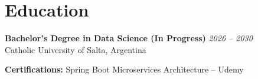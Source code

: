 \documentclass[11pt,a4paper]{article}
\newcommand{\entry}[3]{%
  \noindent\textbf{#1} \hfill \textit{#2} \\
  #3
}
\begin{document}
\section*{Education}
\entry{Bachelor's Degree in Data Science (In Progress)}{2026 -- 2030}{Catholic University of Salta, Argentina}

\vspace{4pt}
\noindent\textbf{Certifications:} Spring Boot Microservices Architecture -- Udemy
\end{document}
